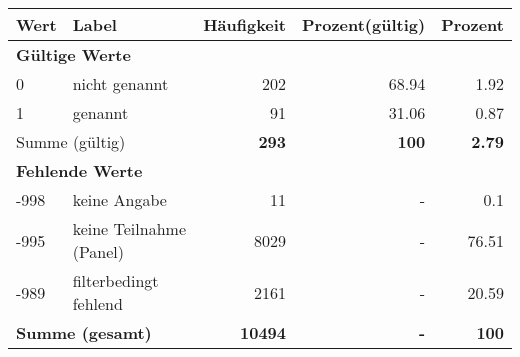      \begin{longtable}{lXrrr}
     \toprule
     \textbf{Wert} & \textbf{Label} & \textbf{Häufigkeit} & \textbf{Prozent(gültig)} & \textbf{Prozent} \\
     \endhead
     \midrule
     \multicolumn{5}{l}{\textbf{Gültige Werte}}\\

     0 &
     \multicolumn{1}{X}{ nicht genannt   } &


       \num{202} &
       \num[round-mode=places,round-precision=2]{68,94} &
         \num[round-mode=places,round-precision=2]{1,92} \\

     1 &
     \multicolumn{1}{X}{ genannt   } &


       \num{91} &
       \num[round-mode=places,round-precision=2]{31,06} &
         \num[round-mode=places,round-precision=2]{0,87} \\
     \midrule
     \multicolumn{2}{l}{Summe (gültig)} &
       \textbf{\num{293}} &
     \textbf{100} &
       \textbf{\num[round-mode=places,round-precision=2]{2,79}} \\
     \multicolumn{5}{l}{\textbf{Fehlende Werte}}\\
       -998 &
       keine Angabe &
         \num{11} &
        - &
         \num[round-mode=places,round-precision=2]{0,1} \\
       -995 &
       keine Teilnahme (Panel) &
         \num{8029} &
        - &
         \num[round-mode=places,round-precision=2]{76,51} \\
       -989 &
       filterbedingt fehlend &
         \num{2161} &
        - &
         \num[round-mode=places,round-precision=2]{20,59} \\
     \midrule
     \multicolumn{2}{l}{\textbf{Summe (gesamt)}} &
          \textbf{\num{10494}} &
        \textbf{-} &
        \textbf{100} \\
     \bottomrule
     \end{longtable}
     
